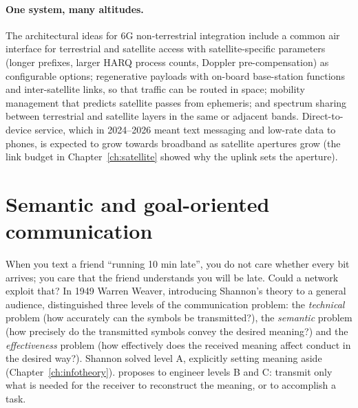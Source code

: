 
\paragraph{One system, many altitudes.} The architectural ideas for 6G non-terrestrial integration
include a common air interface for terrestrial and satellite access with satellite-specific
parameters (longer prefixes, larger HARQ process counts, Doppler pre-compensation) as configurable
options; regenerative payloads with on-board base-station functions and inter-satellite links, so
that traffic can be routed in space; mobility management that predicts satellite passes from
ephemeris; and spectrum sharing between terrestrial and satellite layers in the same or adjacent
bands. Direct-to-device service, which in 2024--2026 meant text messaging and low-rate data to phones,
is expected to grow towards broadband as satellite apertures grow (the link budget in
Chapter~\ref{ch:satellite} showed why the uplink sets the aperture).

\section{Semantic and goal-oriented communication}
\label{sec:ch25:semantic}

When you text a friend ``running 10 min late'', you do not care whether every bit arrives; you care
that the friend understands you will be late. Could a network exploit that? In 1949 Warren Weaver,
introducing Shannon's theory to a general audience, distinguished three levels of the communication
problem: the \emph{technical} problem (how accurately can the symbols be transmitted?), the
\emph{semantic} problem (how precisely do the transmitted symbols convey the desired meaning?) and the
\emph{effectiveness} problem (how effectively does the received meaning affect conduct in the desired
way?). Shannon solved level A, explicitly setting meaning aside (Chapter~\ref{ch:infotheory}).
 proposes to engineer levels B and C: transmit only what is needed for
the receiver to reconstruct the meaning, or to accomplish a task.

